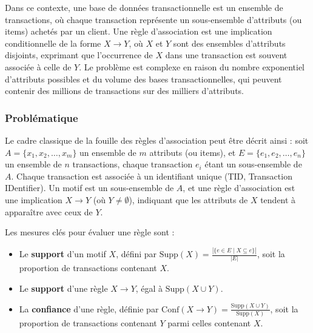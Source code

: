 \documentclass[a4paper,12pt]{report}
\begin{document}
        Dans ce contexte, une base de données transactionnelle est un ensemble de transactions, où chaque transaction représente un sous-ensemble d’attributs (ou items) achetés par un client. Une règle d’association est une implication conditionnelle de la forme \( X \rightarrow Y \), où \( X \) et \( Y \) sont des ensembles d’attributs disjoints, exprimant que l’occurrence de \( X \) dans une transaction est souvent associée à celle de \( Y \). Le problème est complexe en raison du nombre exponentiel d’attributs possibles et du volume des bases transactionnelles, qui peuvent contenir des millions de transactions sur des milliers d’attributs.
        
        
        \subsubsection{Problématique}
        \label{sec:prob_assoc}
        
        Le cadre classique de la fouille des règles d’association peut être décrit ainsi : soit \( A = \{x_1, x_2, \dots, x_m\} \) un ensemble de \( m \) attributs (ou items), et \( E = \{e_1, e_2, \dots, e_n\} \) un ensemble de \( n \) transactions, chaque transaction \( e_i \) étant un sous-ensemble de \( A \). Chaque transaction est associée à un identifiant unique (TID, Transaction IDentifier). Un motif est un sous-ensemble de \( A \), et une règle d’association est une implication \( X \rightarrow Y \) (où \( Y \neq \emptyset \)), indiquant que les attributs de \( X \) tendent à apparaître avec ceux de \( Y \).
        
        Les mesures clés pour évaluer une règle sont :
        \begin{itemize}
            \item Le \textbf{support} d’un motif \( X \), défini par \( \text{Supp}(X) = \frac{|\{e \in E \mid X \subseteq e\}|}{|E|} \), soit la proportion de transactions contenant \( X \).
            \item Le \textbf{support} d’une règle \( X \rightarrow Y \), égal à \( \text{Supp}(X \cup Y) \).
            \item La \textbf{confiance} d’une règle, définie par \( \text{Conf}(X \rightarrow Y) = \frac{\text{Supp}(X \cup Y)}{\text{Supp}(X)} \), soit la proportion de transactions contenant \( Y \) parmi celles contenant \( X \).
        \end{itemize}
        
\end{document}
